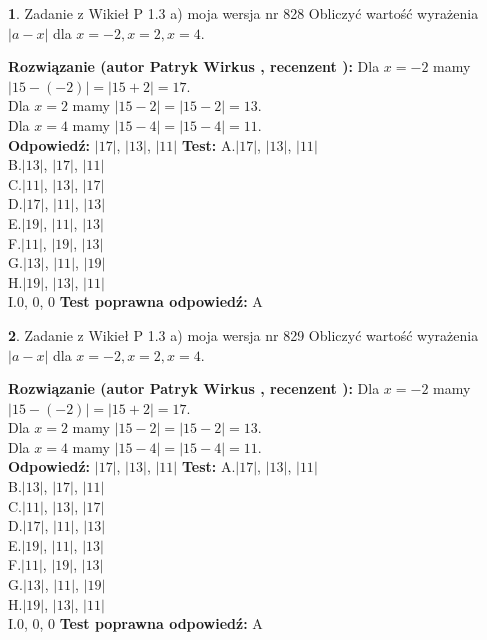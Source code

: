 \documentclass[12pt, a4paper]{article}
\theoremstyle{definition} %
\newtheorem{zad}{}
\newcommand{\zadStart}[1]{\begin{zad}#1\newline}
\newcommand{\zadStop}{\end{zad}}
\newcommand{\rozwStart}[2]{\noindent \textbf{Rozwiązanie (autor #1 , recenzent #2): }\newline}
\newcommand{\rozwStop}{\newline}
\newcommand{\odpStart}{\noindent \textbf{Odpowiedź:}\newline}
\newcommand{\odpStop}{\newline}
\newcommand{\testStart}{\noindent \textbf{Test:}\newline}
\newcommand{\testStop}{\newline}
\newcommand{\kluczStart}{\noindent \textbf{Test poprawna odpowiedź:}\newline}
\newcommand{\kluczStop}{\newline}
\begin{document}
\zadStart{Zadanie z Wikieł P 1.3 a) moja wersja nr 828}
Obliczyć wartość wyrażenia $|a - x|$ dla $x=-2,x=2,x=4$.
\zadStop
\rozwStart{Patryk Wirkus}{}
Dla $x = -2$ mamy $|15 - (-2)| = |15 + 2| = 17$.\\
Dla $x = 2$ mamy $|15 - 2| = |15 - 2| = 13$.\\
Dla $x = 4$ mamy $|15 - 4| = |15 - 4| = 11$.\\
\rozwStop
\odpStart
$|17|$, $|13|$, $|11|$
\odpStop
\testStart
A.$|17|$, $|13|$, $|11|$\\
B.$|13|$, $|17|$, $|11|$\\
C.$|11|$, $|13|$, $|17|$\\
D.$|17|$, $|11|$, $|13|$\\
E.$|19|$, $|11|$, $|13|$\\
F.$|11|$, $|19|$, $|13|$\\
G.$|13|$, $|11|$, $|19|$\\
H.$|19|$, $|13|$, $|11|$\\
I.$0$, $0$, $0$
\testStop
\kluczStart
A
\kluczStop



\zadStart{Zadanie z Wikieł P 1.3 a) moja wersja nr 829}
Obliczyć wartość wyrażenia $|a - x|$ dla $x=-2,x=2,x=4$.
\zadStop
\rozwStart{Patryk Wirkus}{}
Dla $x = -2$ mamy $|15 - (-2)| = |15 + 2| = 17$.\\
Dla $x = 2$ mamy $|15 - 2| = |15 - 2| = 13$.\\
Dla $x = 4$ mamy $|15 - 4| = |15 - 4| = 11$.\\
\rozwStop
\odpStart
$|17|$, $|13|$, $|11|$
\odpStop
\testStart
A.$|17|$, $|13|$, $|11|$\\
B.$|13|$, $|17|$, $|11|$\\
C.$|11|$, $|13|$, $|17|$\\
D.$|17|$, $|11|$, $|13|$\\
E.$|19|$, $|11|$, $|13|$\\
F.$|11|$, $|19|$, $|13|$\\
G.$|13|$, $|11|$, $|19|$\\
H.$|19|$, $|13|$, $|11|$\\
I.$0$, $0$, $0$
\testStop
\kluczStart
A
\kluczStop
\end{document}
